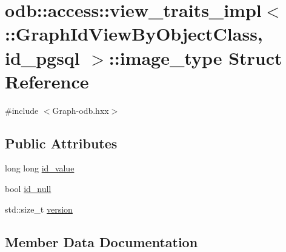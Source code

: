 \hypertarget{structodb_1_1access_1_1view__traits__impl_3_01_1_1_graph_id_view_by_object_class_00_01id__pgsql_01_4_1_1image__type}{}\section{odb\+:\+:access\+:\+:view\+\_\+traits\+\_\+impl$<$ \+:\+:Graph\+Id\+View\+By\+Object\+Class, id\+\_\+pgsql $>$\+:\+:image\+\_\+type Struct Reference}
\label{structodb_1_1access_1_1view__traits__impl_3_01_1_1_graph_id_view_by_object_class_00_01id__pgsql_01_4_1_1image__type}


{\ttfamily \#include $<$Graph-\/odb.\+hxx$>$}

\subsection*{Public Attributes}
\begin{DoxyCompactItemize}
\item 
long long \hyperlink{structodb_1_1access_1_1view__traits__impl_3_01_1_1_graph_id_view_by_object_class_00_01id__pgsql_01_4_1_1image__type_a7bd02fc747e241ee516c4cd4db2c89ab}{id\+\_\+value}
\item 
bool \hyperlink{structodb_1_1access_1_1view__traits__impl_3_01_1_1_graph_id_view_by_object_class_00_01id__pgsql_01_4_1_1image__type_a5d64c73f62ca371d9281f3d2c8143b00}{id\+\_\+null}
\item 
std\+::size\+\_\+t \hyperlink{structodb_1_1access_1_1view__traits__impl_3_01_1_1_graph_id_view_by_object_class_00_01id__pgsql_01_4_1_1image__type_a527807ff0b19ae21be261c44aab6d4bc}{version}
\end{DoxyCompactItemize}


\subsection{Member Data Documentation}
\hypertarget{structodb_1_1access_1_1view__traits__impl_3_01_1_1_graph_id_view_by_object_class_00_01id__pgsql_01_4_1_1image__type_a5d64c73f62ca371d9281f3d2c8143b00}{}
